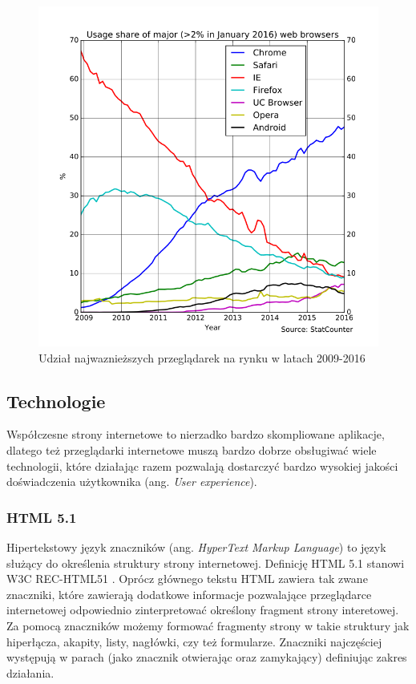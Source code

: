 \documentclass[polish, twoside, 12pt]{mwart}
\begin{document}
\begin{figure}[ht]
  \includegraphics[width=\textwidth]{web-browers-usage-share.png}
	\caption{Udział najwaznieższych przeglądarek na rynku w latach 2009-2016}
\end{figure}

\subsection{Technologie}

Współczesne strony internetowe to nierzadko bardzo skompliowane aplikacje, dlatego też przeglądarki internetowe muszą bardzo dobrze obsługiwać wiele technologii, które działając razem pozwalają dostarczyć bardzo wysokiej jakości doświadczenia użytkownika (ang. \emph{User experience}). 

\subsubsection{HTML 5.1} \label{html}

Hipertekstowy język znaczników (ang. \emph{HyperText Markup Language}) to język służący do określenia struktury strony internetowej. Definicję HTML 5.1 stanowi W3C REC-HTML51 \cite{w3c-rec-html51}. Oprócz głównego tekstu HTML zawiera tak zwane znaczniki, które zawierają dodatkowe informacje pozwalające przeglądarce internetowej odpowiednio zinterpretować określony fragment strony interetowej. Za pomocą znaczników możemy formować fragmenty strony w takie struktury jak hiperłącza, akapity, listy, nagłówki, czy też formularze. Znaczniki najczęściej występują w parach (jako znacznik otwierając oraz zamykający) definiując zakres działania.
\end{document}
